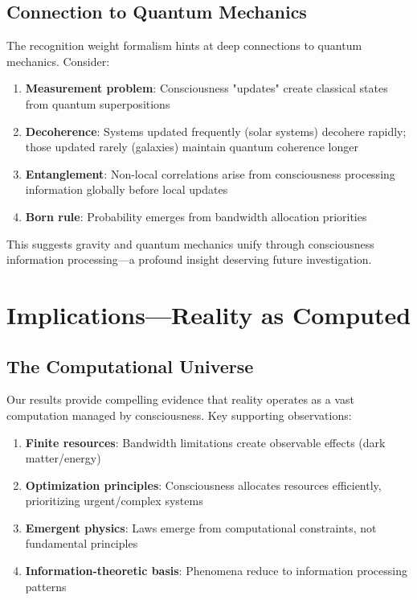 \documentclass[twocolumn,prd,amsmath,amssymb,aps,superscriptaddress,nofootinbib]{revtex4-2}
\begin{document}
\subsection{Connection to Quantum Mechanics}

The recognition weight formalism hints at deep connections to quantum mechanics. Consider:

\begin{enumerate}
\item \textbf{Measurement problem}: Consciousness "updates" create classical states from quantum superpositions
\item \textbf{Decoherence}: Systems updated frequently (solar systems) decohere rapidly; those updated rarely (galaxies) maintain quantum coherence longer
\item \textbf{Entanglement}: Non-local correlations arise from consciousness processing information globally before local updates
\item \textbf{Born rule}: Probability emerges from bandwidth allocation priorities
\end{enumerate}

This suggests gravity and quantum mechanics unify through consciousness information processing---a profound insight deserving future investigation.

\section{Implications---Reality as Computed}
\label{sec:implications}

\subsection{The Computational Universe}

Our results provide compelling evidence that reality operates as a vast computation managed by consciousness. Key supporting observations:

\begin{enumerate}
\item \textbf{Finite resources}: Bandwidth limitations create observable effects (dark matter/energy)
\item \textbf{Optimization principles}: Consciousness allocates resources efficiently, prioritizing urgent/complex systems
\item \textbf{Emergent physics}: Laws emerge from computational constraints, not fundamental principles
\item \textbf{Information-theoretic basis}: Phenomena reduce to information processing patterns
\end{enumerate}
\end{document}
